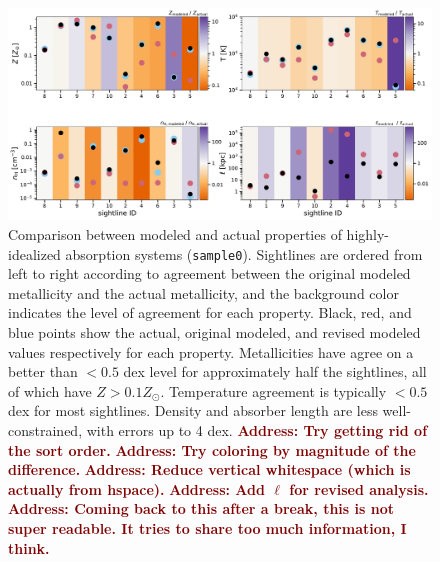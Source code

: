 \documentclass[fleqn,usenatbib]{mnras}
\newcommand{\todo}[1]{\textcolor{Maroon}{\textbf{Address: #1}}}
\begin{document}
\begin{figure}
    \centering
    \includegraphics[width=\textwidth]{figures/sample0/comparison.pdf}
    \caption{
    Comparison between modeled and actual properties of highly-idealized absorption systems (\texttt{sample0}).
    Sightlines are ordered from left to right according to agreement between the original modeled metallicity and the actual metallicity, and the background color indicates the level of agreement for each property.
    Black, red, and blue points show the actual, original modeled, and revised modeled values respectively for each property.
    Metallicities have agree on a better than $<0.5$ dex level for approximately half the sightlines, all of which have $Z > 0.1 Z_\odot$.
    Temperature agreement is typically $<0.5$ dex for most sightlines.
    Density and absorber length are less well-constrained, with errors up to 4 dex.
    \todo{Try getting rid of the sort order.}
    \todo{Try coloring by magnitude of the difference.}
    \todo{Reduce vertical whitespace (which is actually from hspace).}
    \todo{Add $\ell$ for revised analysis.}
    \todo{Coming back to this after a break, this is not super readable.
    It tries to share too much information, I think.}
    }
    \label{f: idealized}
\end{figure}
\end{document}
